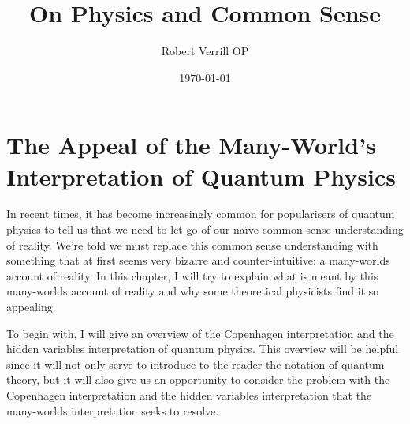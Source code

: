 \documentclass[letter, 12pt]{turabian-thesis}
\title{On Physics and Common Sense}
\author{Robert Verrill OP}
\date{\today}
\theoremstyle{hypothesis}
\begin{document}
\justifying
\setlength{\abovedisplayskip}{3pt}
\setlength{\belowdisplayskip}{3pt}
\setlength{\textheight}{675pt}
\setlength{\parindent}{0em}
\setlength{\oddsidemargin}{10pt}
\setlength{\marginparwidth}{80pt}

\maketitle
\begin{comment}
\section{Introduction}
\emph{}

Common sense is very often underated. This is especially so in the light of modern physics. Not infrequently, one hears people claim that modern physics shows us that reality is fundamentally weird and that we must discard our naive common sense intuitions. Now perhaps these people are right, but if we are to accept their claims, they ought to have really compelling reasons. The usual response to an argument that results in wierd or seemingly absurd conclusions is to question the argument's premises or examine whether the argument is logically valid. 
\end{comment}
\chapter{The Appeal of the Many-World's Interpretation of Quantum Physics}
In recent times, it has become increasingly common for popularisers of quantum physics to tell us that we need to let go of our naïve common sense understanding of reality. We're told we must replace this common sense understanding with something that at first seems very bizarre and counter-intuitive: a many-worlds account of reality. In this chapter, I will try to explain what is meant by this many-worlds account of reality and why some theoretical physicists find it so appealing.

To begin with, I will give an overview of the Copenhagen interpretation and the hidden variables interpretation of quantum physics. This overview will be helpful since it will not only serve to introduce to the reader the notation of quantum theory, but it will also give us an opportunity to consider the problem with the Copenhagen interpretation and the hidden variables interpretation that the many-worlds interpretation seeks to resolve. 
\end{document}
